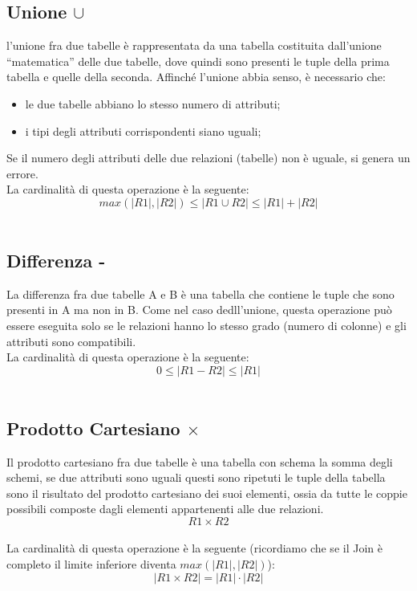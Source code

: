 \documentclass{report}
\begin{document}
\subsection{Unione $\cup$}
l’unione fra due tabelle è rappresentata da una tabella costituita dall’unione “matematica” delle due tabelle, dove quindi sono presenti le tuple della prima tabella e quelle della seconda. Affinché l’unione abbia senso, è necessario che:
\begin{itemize}
    \item le due tabelle abbiano lo stesso numero di attributi;
    \item i tipi degli attributi corrispondenti siano uguali;
\end{itemize}
Se il numero degli attributi delle due relazioni (tabelle) non è uguale, si genera un errore.\\
La cardinalità di questa operazione è la seguente:\\
$$max(|R1|, |R2|) \leq |R1 \cup R2| \leq |R1| + |R2|$$\\

\subsection{Differenza -}
La differenza fra due tabelle A e B è una tabella che contiene le tuple che sono presenti in A ma non in
B. Come nel caso dedll'unione, questa operazione può essere eseguita solo se le relazioni hanno lo stesso grado (numero di colonne) e gli attributi sono compatibili.\\
La cardinalità di questa operazione è la seguente:\\
$$0 \leq |R1 - R2| \leq |R1|$$\\

\subsection{Prodotto Cartesiano $\times$}
Il prodotto cartesiano fra due tabelle è una tabella con schema la somma degli schemi, se due attributi
sono uguali questi sono ripetuti le tuple della tabella sono il risultato del prodotto cartesiano dei suoi elementi, ossia da tutte le coppie possibili composte dagli elementi appartenenti alle due relazioni.\\
$$R1\times R2$$\\
La cardinalità di questa operazione è la seguente (ricordiamo che se il Join è completo il limite inferiore diventa $max(|R1|,|R2|)$):\\
$$|R1 \times R2| = |R1| \cdot |R2|$$\\
\end{document}
